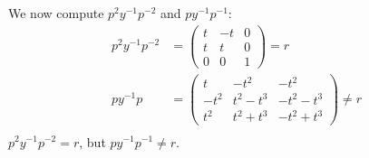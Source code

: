 \documentclass{article}
\begin{document}
We now compute $p^2y^{-1}p^{-2}$ and $py^{-1}p^{-1}$:
\begin{equation}
    \begin{split}
        p^2y^{-1}p^{-2} & = 
        \begin{pmatrix} 
            t & -t & 0 \\
            t & t & 0  \\
            0 & 0 & 1
        \end{pmatrix} = r \\
        py^{-1}p & =  
        \begin{pmatrix} 
            t & -t^2 & -t^2 \\
            -t^2 & t^2 - t^3 & -t^2 - t^3 \\
            t^2 & t^2 + t^3 & -t^2 + t^3
        \end{pmatrix} \neq r \\
    \end{split}
\end{equation}
$p^2y^{-1}p^{-2} = r$, but $py^{-1}p^{-1} \neq r$.

\clearpage
\end{document}
